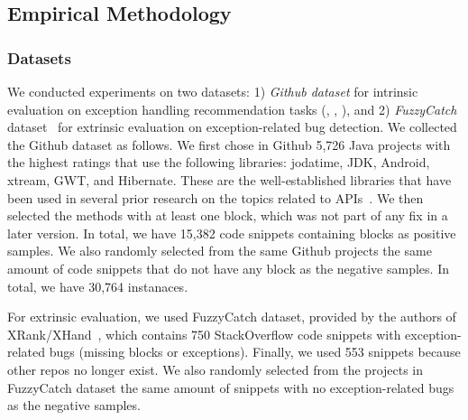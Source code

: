 \subsection{Empirical Methodology}

\subsubsection{Datasets}


We conducted experiments on two datasets: 1) {\em Github dataset}
for intrinsic evaluation on exception handling recommendation tasks
({\xblock}, {\xstate}, {\xtype}), and 2) {\em FuzzyCatch}
dataset~\cite{xrank-fse20} for extrinsic evaluation on
exception-related bug detection.
%
%
We collected the Github dataset as follows. We first chose in Github
5,726 Java projects with the highest ratings that use
the following libraries: jodatime, JDK, Android, xtream, GWT, and
Hibernate. These are the well-established libraries that have been used
in several prior research on the topics related to
APIs~\cite{icse18,liveapi14}. We then selected the methods with at
least one  block, which was not part of any fix in
a later version.
In total, we have
15,382 code snippets containing  blocks as positive
samples. We also randomly selected from the same Github projects the
same amount of code snippets that do not have any 
block as the negative samples. In total, we have 30,764 instanaces.

For extrinsic evaluation, we used FuzzyCatch dataset, provided by the
authors of XRank/XHand~\cite{xrank-fse20}, which contains 750
StackOverflow code snippets with exception-related bugs (missing
 blocks or exceptions). Finally, we used 553 snippets
because other repos no longer exist. We also randomly selected from
the projects in FuzzyCatch dataset the same amount of snippets with no
exception-related bugs as the negative samples.


